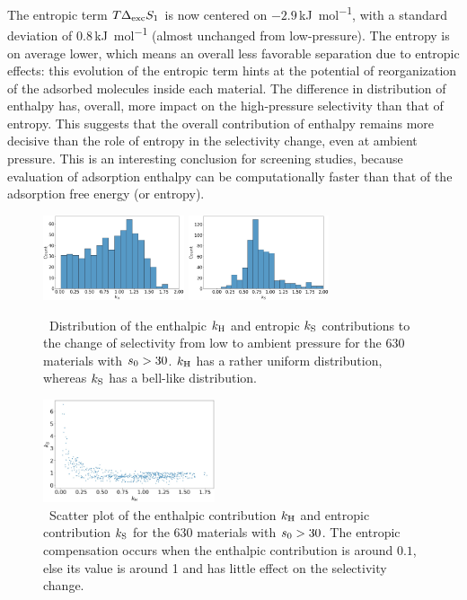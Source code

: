 \documentclass[main.tex]{subfiles}
\begin{document}
  The entropic term $T\Delta_{\text{exc}}S_{\text{1}}$ is now centered on $-2.9$\,\si{\kilo\joule\per\mol}, with a standard deviation of $0.8$\,\si{\kilo\joule\per\mol} (almost unchanged from low-pressure). The entropy is on average lower, which means an overall less favorable separation due to entropic effects: this evolution of the entropic term hints at the potential of reorganization of the adsorbed molecules inside each material. The difference in distribution of enthalpy has, overall, more impact on the high-pressure selectivity than that of entropy. This suggests that the overall contribution of enthalpy remains more decisive than the role of entropy in the selectivity change, even at ambient pressure. This is an interesting conclusion for screening studies, because evaluation of adsorption enthalpy can be computationally faster than that of the adsorption free energy (or entropy).

\begin{figure}[t]
  \centering
    \includegraphics[width=0.37\textwidth]{figures/2-thermo/k_H.jpg}
    \hspace{8mm}
    \includegraphics[width=0.37\textwidth]{figures/2-thermo/k_S.jpg}
    \caption{\ Distribution of the enthalpic $k_{\text{H}}$ and entropic $k_{\text{S}}$ contributions to the change of selectivity from low to ambient pressure for the 630 materials with $s_{\text{0}}>30$. $k_{\text{H}}$ has a rather uniform distribution, whereas $k_{\text{S}}$ has a bell-like distribution. }
    \label{fgr:distk}
  \end{figure}
  
  \begin{figure}[t]
  \centering
    \includegraphics[width=0.45\textwidth]{figures/2-thermo/k_S_vs_k_H.jpg}
    \caption{\ Scatter plot of the enthalpic contribution $k_{\text{H}}$ and entropic contribution $k_{\text{S}}$ for the 630 materials with $s_{\text{0}}>30$. The entropic compensation occurs when the enthalpic contribution is around $0.1$, else its value is around 1 and has little effect on the selectivity change.}
    \label{fgr:scatterk}
  \end{figure}
  
\end{document}
